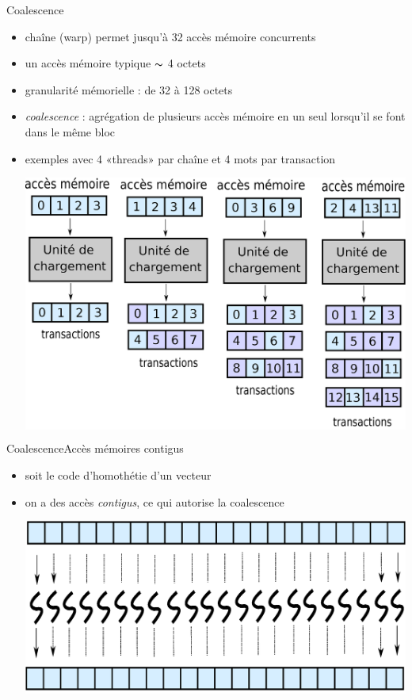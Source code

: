 \documentclass[11pt,mathserif]{beamer}
\newcommand{\argi}{\faLightbulbO}
\newcommand{\adibi}{\faCommentO}
\newcommand{\harritu}{\faExclamation}
\newcommand{\extcu}{cu}
\newcommand{\extcu}{cuf}
\newcommand{\includeSrcCu}[1]{}
\begin{document}
\begin{frame}{Coalescence}
  \begin{itemize}[<+->]
    \item[\argi] chaîne (warp) permet jusqu'à 32 accès mémoire concurrents
    \item[\argi] un accès mémoire typique $\thicksim$ 4 octets
    \item[\argi] granularité mémorielle : de 32 à 128 octets 
    \item[\harritu] {\em coalescence} : agrégation de plusieurs accès mémoire en un seul lorsqu'il se font dans le même bloc
    \item[\adibi] exemples avec 4 «threads» par chaîne et 4 mots par transaction
\begin{center}
  \colorbox{white}{\includegraphics[width=0.6\linewidth]{fig/coalescence.eps}}
\end{center}
  \end{itemize}
\end{frame}

\begin{frame}{Coalescence}{Accès mémoires contigus}
  \begin{itemize}[<+->]
    \item[\adibi] soit le code d'homothétie d'un vecteur
\begin{center}
\includeSrcCu{code/scale}
\end{center}
    \item[\argi] on a des accès {\em contigus}, ce qui autorise la coalescence
\begin{center}
  \vspace{0.5cm}
  \colorbox{white}{\includegraphics[width=0.8\linewidth]{fig/coalScale.eps}}
\end{center}
  \end{itemize}
\end{frame}
\end{document}
